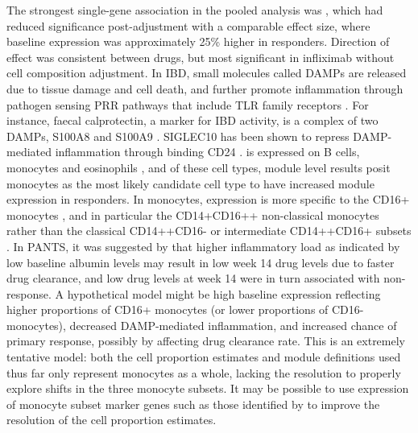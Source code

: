 The strongest single-gene association in the pooled analysis was , 
which had reduced significance post-adjustment with a comparable effect size,
where baseline expression was approximately 25\% higher in responders.
Direction of effect was consistent between drugs, but most significant in infliximab without cell composition adjustment.
In \gls{IBD}, small molecules called \glspl{DAMP} are released due to tissue damage and cell death, 
and further promote inflammation through pathogen sensing \gls{PRR} pathways that include \gls{TLR} family receptors \autocite{boyapati2016GutMucosalDAMPs,desouza2016ImmunopathogenesisIBDCurrent}.
For instance, faecal calprotectin, a marker for \gls{IBD} activity, is a complex of two \glspl{DAMP}, S100A8 and S100A9 \autocite{desouza2016ImmunopathogenesisIBDCurrent}.
SIGLEC10 has been shown to repress \gls{DAMP}-mediated inflammation through binding CD24 \autocite{boyapati2016GutMucosalDAMPs}.
 is expressed on B cells, monocytes and eosinophils \autocite{crocker2007SiglecsTheirRoles},
and of these cell types, module level results posit monocytes as the most likely candidate cell type to have increased module expression in responders.
In monocytes,  expression is more specific to the CD16+ monocytes \autocite{martinez2009TranscriptomeHumanMonocyte},
and in particular the CD14+CD16++ non-classical monocytes rather than the classical CD14++CD16- or intermediate CD14++CD16+ subsets \autocite{villani2017SinglecellRNAseqReveals}.
In \gls{PANTS}, it was suggested by \textcite{kennedy2019PredictorsAntiTNFTreatment} that higher inflammatory load as indicated by low baseline albumin levels 
may result in low week 14 drug levels due to faster drug clearance,
and low drug levels at week 14 were in turn associated with non-response.
A hypothetical model might be high baseline  expression reflecting 
higher proportions of CD16+ monocytes (or lower proportions of CD16- monocytes),
decreased \gls{DAMP}-mediated inflammation, 
and increased chance of primary response, possibly by affecting drug clearance rate.
This is an extremely tentative model:
both the cell proportion estimates and module definitions used thus far only represent monocytes as a whole,
lacking the resolution to properly explore shifts in the three monocyte subsets.
It may be possible to use expression of monocyte subset marker genes such as those identified by \textcite{villani2017SinglecellRNAseqReveals} to improve the resolution of the cell proportion estimates.

